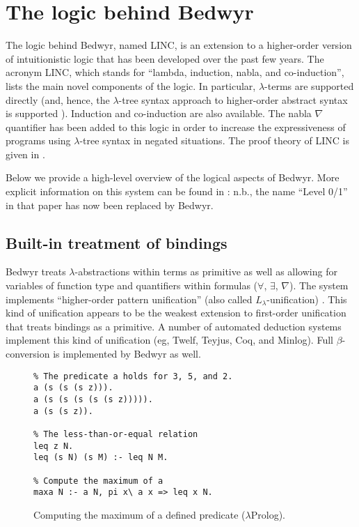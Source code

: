 \documentclass{article}
\newcommand{\lp}{$\lambda$Prolog}
\newcommand{\Ll}{$L_\lambda$}
\begin{document}
\section{The logic behind Bedwyr}
\label{logic}

The logic behind Bedwyr, named LINC, is an extension to a higher-order
version of intuitionistic logic that has been developed over the past
few years.  The acronym LINC, which stands for ``lambda, induction,
nabla, and co-induction'', lists the main novel components of the
logic.  In particular, $\lambda$-terms are supported directly (and,
hence, the $\lambda$-tree syntax approach to higher-order abstract
syntax is supported \cite{miller00cl}).  Induction and co-induction
are also available.  The nabla $\nabla$ quantifier has been added to
this logic in order to increase the expressiveness of programs using
$\lambda$-tree syntax in negated situations.  The proof theory of LINC
is given in \cite{miller05tocl,tiu04phd}.

Below we provide a high-level overview of the logical aspects of Bedwyr.
More explicit information on this system can be found in
\cite{tiu05eshol}: n.b., the name ``Level 0/1'' in that paper has now
been replaced by Bedwyr.

\subsection{Built-in treatment of bindings}

Bedwyr treats $\lambda$-abstractions within terms as primitive as well
as allowing for variables of function type and quantifiers within
formulas ($\forall$, $\exists$, $\nabla$).  The system
implements ``higher-order pattern unification'' (also called
\Ll-unification) \cite{miller91jlc}.   This kind of unification
appears to be the weakest extension to first-order unification that
treats bindings as a primitive.  A number of automated deduction systems
implement this kind of unification (eg, Twelf, Teyjus, Coq, and
Minlog).  Full $\beta$-conversion is implemented by Bedwyr as well.

\begin{figure}
\begin{verbatim}
% The predicate a holds for 3, 5, and 2.
a (s (s (s z))).
a (s (s (s (s (s z))))).
a (s (s z)).

% The less-than-or-equal relation
leq z N.
leq (s N) (s M) :- leq N M.

% Compute the maximum of a
maxa N :- a N, pi x\ a x => leq x N.
\end{verbatim}
\caption{Computing the maximum of a defined predicate (\lp).}
\label{maxa-lp}
\end{figure}
\end{document}
